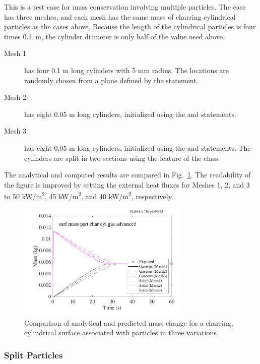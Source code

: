 \documentclass[11pt]{book}
\begin{document}
This is a test case for mass conservation involving multiple particles. The case has three meshes, and each mesh has the same mass of charring cylindrical particles as the cases above. Because the length of the cylindrical particles is four times 0.1~m, the cylinder diameter is only half of the value used above.
\begin{description}
\item[Mesh 1] has four 0.1 m long cylinders with 5 mm radius. The locations are randomly chosen from a plane defined by the  statement.
\item[Mesh 2] has eight 0.05 m long cylinders, initialized using the  and  statements.
\item[Mesh 3] has eight 0.05 m long cylinders, initialized using the  and  statements. The cylinders are split in two sections using the
 feature of the  class.
\end{description}
The analytical and computed results are compared in Fig.~\ref{surf_mass_part_char_advanced}. The readability of the figure is improved by setting the external heat fluxes for Meshes 1, 2, and 3 to 50 \si{kW/m^2}, 45 \si{kW/m^2}, and 40 \si{kW/m^2}, respectively.
\begin{figure}[!htb]
\centering
\includegraphics[width=3.2in]{SCRIPT_FIGURES/surf_mass_part_char_cyl_gas_advanced}
\caption[The  test case]{Comparison of analytical and predicted mass change for a charring, cylindrical surface associated with particles in three variations.}
\label{surf_mass_part_char_advanced}
\end{figure}

\subsubsection{Split Particles}
\label{surf_mass_part_char_cart_fuel_split}
\label{surf_mass_part_nonchar_cart_fuel_split}
\label{surf_mass_part_char_cyl_fuel_split}
\label{surf_mass_part_nonchar_cyl_fuel_split}
\label{surf_mass_part_char_spher_fuel_split}
\label{surf_mass_part_nonchar_spher_fuel_split}
\label{surf_mass_part_char_cart_fuel_energy_split}
\label{surf_mass_part_nonchar_cart_fuel_energy_split}
\label{surf_mass_part_char_cyl_fuel_energy_split}
\label{surf_mass_part_nonchar_cyl_fuel_energy_split}
\label{surf_mass_part_char_spher_fuel_energy_split}
\label{surf_mass_part_nonchar_spher_fuel_energy_split}
\end{document}
